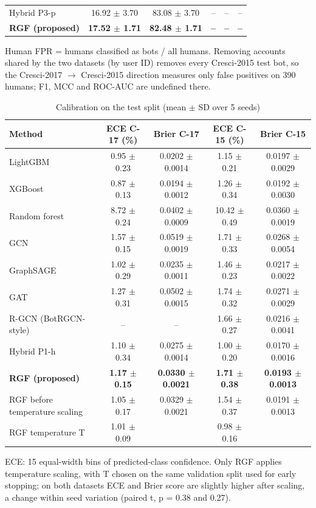 \begin{table}[!t]
\begin{tabular}{lccccc}
Hybrid P3-p & 16.92 $\pm$ 3.70 & 83.08 $\pm$ 3.70 & -- & -- & -- \\
\textbf{RGF (proposed)} & \textbf{17.52 $\pm$ 1.71} & \textbf{82.48 $\pm$ 1.71} & \textbf{--} & \textbf{--} & \textbf{--} \\
\hline
\end{tabular}
\par\smallskip\parbox{\linewidth}{\scriptsize Human FPR = humans classified as bots / all humans. Removing accounts shared by the two datasets (by user ID) removes every Cresci-2015 test bot, so the Cresci-2017 $\rightarrow$ Cresci-2015 direction measures only false positives on 390 humans; F1, MCC and ROC-AUC are undefined there.}
\end{table}

\begin{table}[!t]
\centering
\caption{Calibration on the test split (mean $\pm$ SD over 5 seeds)}
\label{tab:calibration}
\footnotesize
\setlength{\tabcolsep}{3pt}
\begin{tabular}{lcccc}
\hline
\textbf{Method} & \textbf{ECE C-17 (\%)} & \textbf{Brier C-17} & \textbf{ECE C-15 (\%)} & \textbf{Brier C-15} \\
\hline
LightGBM & 0.95 $\pm$ 0.23 & 0.0202 $\pm$ 0.0014 & 1.15 $\pm$ 0.21 & 0.0197 $\pm$ 0.0029 \\
XGBoost & 0.87 $\pm$ 0.13 & 0.0194 $\pm$ 0.0012 & 1.26 $\pm$ 0.34 & 0.0192 $\pm$ 0.0030 \\
Random forest & 8.72 $\pm$ 0.24 & 0.0402 $\pm$ 0.0009 & 10.42 $\pm$ 0.49 & 0.0360 $\pm$ 0.0019 \\
GCN & 1.57 $\pm$ 0.15 & 0.0519 $\pm$ 0.0019 & 1.71 $\pm$ 0.33 & 0.0268 $\pm$ 0.0054 \\
GraphSAGE & 1.02 $\pm$ 0.29 & 0.0235 $\pm$ 0.0011 & 1.46 $\pm$ 0.23 & 0.0217 $\pm$ 0.0022 \\
GAT & 1.27 $\pm$ 0.31 & 0.0502 $\pm$ 0.0015 & 1.74 $\pm$ 0.32 & 0.0271 $\pm$ 0.0029 \\
R-GCN (BotRGCN-style) & -- & -- & 1.66 $\pm$ 0.27 & 0.0216 $\pm$ 0.0041 \\
Hybrid P1-h & 1.10 $\pm$ 0.34 & 0.0275 $\pm$ 0.0014 & 1.00 $\pm$ 0.20 & 0.0170 $\pm$ 0.0016 \\
\textbf{RGF (proposed)} & \textbf{1.17 $\pm$ 0.15} & \textbf{0.0330 $\pm$ 0.0021} & \textbf{1.71 $\pm$ 0.38} & \textbf{0.0193 $\pm$ 0.0013} \\
RGF before temperature scaling & 1.05 $\pm$ 0.17 & 0.0329 $\pm$ 0.0021 & 1.54 $\pm$ 0.37 & 0.0191 $\pm$ 0.0013 \\
RGF temperature T & 1.01 $\pm$ 0.09 &  & 0.98 $\pm$ 0.16 &  \\
\hline
\end{tabular}
\par\smallskip\parbox{\linewidth}{\scriptsize ECE: 15 equal-width bins of predicted-class confidence. Only RGF applies temperature scaling, with T chosen on the same validation split used for early stopping; on both datasets ECE and Brier score are slightly higher after scaling, a change within seed variation (paired t, p = 0.38 and 0.27).}
\end{table}

